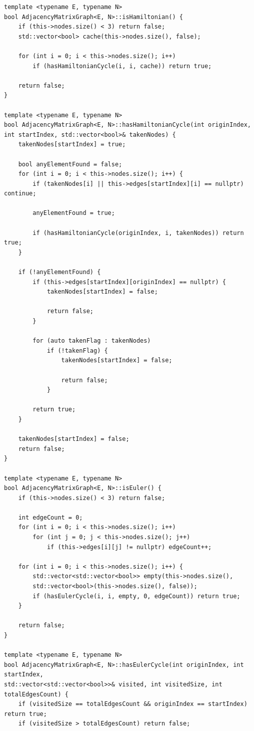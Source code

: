 \documentclass[a4paper,14pt]{extarticle}
\begin{document}
\begin{enumerate}[1.]
\begin{verbatim}
template <typename E, typename N>
bool AdjacencyMatrixGraph<E, N>::isHamiltonian() {
    if (this->nodes.size() < 3) return false;
    std::vector<bool> cache(this->nodes.size(), false);

    for (int i = 0; i < this->nodes.size(); i++)
        if (hasHamiltonianCycle(i, i, cache)) return true;

    return false;
}

template <typename E, typename N>
bool AdjacencyMatrixGraph<E, N>::hasHamiltonianCycle(int originIndex, int startIndex, std::vector<bool>& takenNodes) {
    takenNodes[startIndex] = true;

    bool anyElementFound = false;
    for (int i = 0; i < this->nodes.size(); i++) {
        if (takenNodes[i] || this->edges[startIndex][i] == nullptr) continue;

        anyElementFound = true;
        
        if (hasHamiltonianCycle(originIndex, i, takenNodes)) return true;
    }

    if (!anyElementFound) {
        if (this->edges[startIndex][originIndex] == nullptr) {
            takenNodes[startIndex] = false;

            return false;
        }

        for (auto takenFlag : takenNodes) 
            if (!takenFlag) {
                takenNodes[startIndex] = false;

                return false;
            }

        return true;
    }

    takenNodes[startIndex] = false;
    return false;
}

template <typename E, typename N>
bool AdjacencyMatrixGraph<E, N>::isEuler() {
    if (this->nodes.size() < 3) return false;

    int edgeCount = 0;
    for (int i = 0; i < this->nodes.size(); i++) 
        for (int j = 0; j < this->nodes.size(); j++) 
            if (this->edges[i][j] != nullptr) edgeCount++;

    for (int i = 0; i < this->nodes.size(); i++) {
        std::vector<std::vector<bool>> empty(this->nodes.size(), 
        std::vector<bool>(this->nodes.size(), false));
        if (hasEulerCycle(i, i, empty, 0, edgeCount)) return true;
    }

    return false;
}

template <typename E, typename N>
bool AdjacencyMatrixGraph<E, N>::hasEulerCycle(int originIndex, int startIndex, 
std::vector<std::vector<bool>>& visited, int visitedSize, int totalEdgesCount) {
    if (visitedSize == totalEdgesCount && originIndex == startIndex) return true;
    if (visitedSize > totalEdgesCount) return false;


\end{verbatim}
\end{enumerate}
\end{document}
